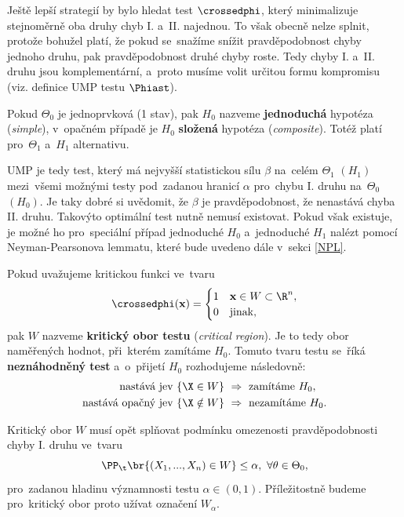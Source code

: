 \begin{remark} Ještě lepší strategií by bylo hledat test $\crossedphi$, který minimalizuje stejnoměrně oba druhy chyb I. a~II. najednou. To však obecně nelze splnit, protože bohužel platí, že pokud se~snažíme snížit pravděpodobnost chyby jednoho druhu, pak pravděpodobnost druhé chyby roste. Tedy chyby I. a~II. druhu jsou komplementární, a~proto musíme volit určitou formu kompromisu (viz. definice UMP testu $\Phiast$). 
\end{remark}
\begin{define}	Pokud $\Theta_0$ je jednoprvková (1 stav), pak $H_0$ nazveme \textbf{jednoduchá} hypotéza (\textit{simple}), v~opačném případě je $H_0$ \textbf{složená} hypotéza (\textit{composite}). Totéž platí pro~$\Theta_1$ a~$H_1$ alternativu.
\end{define}
UMP je tedy test, který má nejvyšší statistickou sílu $\beta$ na~celém $\Theta_1$ $(H_1)$ mezi~všemi možnými testy pod~zadanou hranicí $\alpha$ pro~chybu I. druhu na~$\Theta_0$ $(H_0)$. Je taky dobré si uvědomit, že $\beta$ je pravděpodobnost, že nenastává chyba II. druhu. Takovýto optimální test nutně nemusí existovat. Pokud však existuje, je možné ho pro~speciální případ jednoduché $H_0$ a~jednoduché $H_1$ nalézt pomocí Neyman-Pearsonova lemmatu, které bude uvedeno dále v~sekci \ref{NPL}. 

\begin{define}
	Pokud uvažujeme kritickou funkci ve~tvaru $$\crossedphi(\textbf{x})=\begin{cases}
	1 & \textbf{x}\in W\subset\R^n, \\ 0 & \text{jinak},
	\end{cases}$$ pak $W$ nazveme \textbf{kritický obor testu} (\textit{critical region}). Je to tedy obor naměřených hodnot, při~kterém zamítáme $H_0$. Tomuto tvaru testu se~říká \textbf{neznáhodněný test} a~o~přijetí $H_0$ rozhodujeme následovně: \[
	\begin{split}
	\text{nastává jev }\{\X\in W\} ~&\Rightarrow~\text{zamítáme }H_0, \\ \text{nastává opačný jev }\{\X\notin W\} ~&\Rightarrow~\text{nezamítáme }H_0. 
	\end{split}
	\]\end{define} 
Kritický obor $W$ musí opět splňovat podmínku omezenosti pravděpodobnosti chyby I. druhu ve~tvaru $$ \PP_\t\br{(X_1,...,X_n)\in W}\leq \alpha,~\forall\theta\in\Theta_0, $$ pro~zadanou hladinu významnosti testu $\alpha\in(0,1)$. Příležitostně budeme pro~kritický obor proto užívat označení $W_\alpha$.

